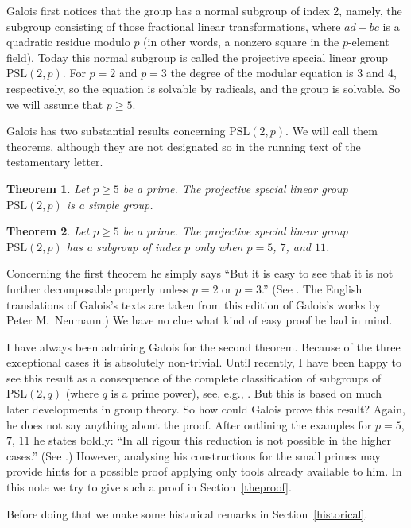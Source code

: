 \documentclass[reqno,12pt]{amsart}
\newtheorem{theorem}{Theorem}
\theoremstyle{definition}
\newcommand{\PSL}{\mathrm{PSL}}
\begin{document}
Galois first notices that the group has a normal subgroup of index 2, namely, the
subgroup consisting of those fractional linear transformations, where $ad-bc$ is a
quadratic residue modulo $p$
(in other words, a nonzero square in the $p$-element field). Today this normal subgroup is
called the projective special linear group $\PSL(2,p)$. For $p=2$ and $p=3$ the degree of
the modular equation is 3 and 4, respectively, so the equation is solvable by radicals,
and the group is solvable. So we will assume that $p\ge 5$.

Galois has two substantial results concerning $\PSL(2,p)$. We will call them theorems,
although they are not designated so in the running text of the testamentary letter.

\begin{theorem}
Let $p\ge 5$ be a prime. The projective special linear group $\PSL(2,p)$ is a simple group.
\end{theorem}

\begin{theorem}
Let $p\ge 5$ be a prime. The projective special linear group $\PSL(2,p)$ has a subgroup of
index $p$ only when $p=5$, $7$, and $11$.
\end{theorem}

Concerning the first theorem he simply says ``But it is easy to see that it is not further
decomposable properly unless $p=2$ or $p=3$.'' (See \cite[p.~89]{Neumann}. The English translations
of Galois's texts are taken from this edition of Galois's works by Peter M.\ Neumann.)
We have no clue what kind of easy proof he had in mind.

I have always been admiring Galois for the second theorem. Because of the three exceptional
cases it is absolutely non-trivial. Until recently, I have been happy to see this result
as a consequence of the complete classification of subgroups of $\PSL(2,q)$ (where $q$ is
a prime power), see, e.g., \cite[Kapitel II, \S 8]{Huppert}.
But this is based on much later developments in group theory. So how could
Galois prove this result? Again, he does not say anything about the proof.
After outlining the examples for $p=5$, $7$, $11$ he states boldly:
``In all rigour this reduction is not possible in the higher cases.''
(See \cite[p.~91]{Neumann}.)
However, analysing his constructions for the small primes may provide hints for a
possible proof applying only tools already available to him. In this note we try to give
such a proof in Section~\ref{theproof}.

Before doing that we make some historical remarks in Section~\ref{historical}.
\end{document}

